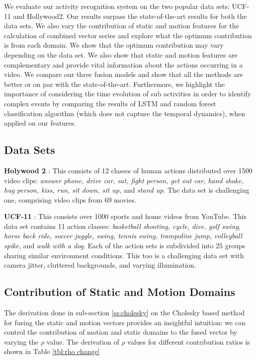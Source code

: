 We evaluate our activity recognition system on the two popular data sets: UCF-11 and Hollywood2. Our results surpass the state-of-the-art
results for both the data sets. We also vary the contribution of static and motion features for the calculation
of combined vector series and explore what the optimum contribution is from each domain. We show that the optimum contribution
may vary depending on the data set. We also show that static and motion features
are complementary and provide vital information about the actions occurring in a video. We compare our three fusion models and show that
all the methods are better or on par with the state-of-the-art. Furthermore, we highlight the importance of considering the time evolution
of sub activities in order to identify complex events by comparing the results of LSTM and random forest classification algorithm (which does not capture
the temporal dynamics), when applied on our features.

\subsection{Data Sets}
\noindent
\textbf{Holywood 2} \cite{marszalek2009actions}: This consists of 12 classes of human actions distributed over 1500 video clips:
\textit{answer phone, drive car, eat, fight person, get out car, hand shake,
hug person, kiss, run, sit down, sit up, }and \textit{stand up}.
The data set is challenging one, comprising video clips from 69 movies.

\noindent
\textbf{UCF-11} \cite{liu2009recognizing}: This consists over 1000
sports and home videos from YouTube. This data set contains 11 action classes:
\textit{basketball shooting, cycle, dive, golf swing, horse
back ride, soccer juggle, swing, tennis swing, trampoline
jump, volleyball spike}, and \textit{walk with a dog}. Each of the action
sets is subdivided into 25 groups sharing similar environment conditions.
This too is a challenging data set with
camera jitter, cluttered backgrounds, and varying illumination.


\subsection{Contribution of Static and Motion Domains}

The derivation done in sub-section \ref{ss:cholesky} on the Cholesky based method for fusing the static and motion vectors
provides an insightful intuition: we can control the contribution
of motion and static domains to the fused vector by varying the $\rho$ value.
The derivation of $\rho$ values for different contribution ratios is shown in
Table \ref{tbl:rho change}




